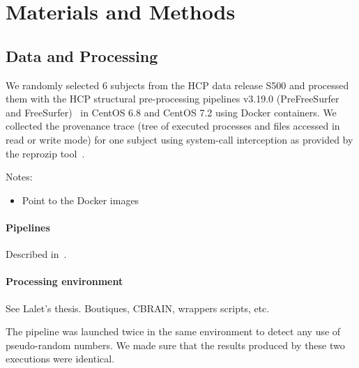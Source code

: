 \documentclass{article}
\begin{document}
\section{Materials and Methods}

\subsection{Data and Processing}

We randomly selected 6 subjects from the HCP data release S500 and
processed them with the HCP structural pre-processing pipelines
v3.19.0 (PreFreeSurfer and FreeSurfer)~\cite{Glasser2013} in CentOS
6.8 and CentOS 7.2 using Docker containers. We collected the
provenance trace (tree of executed processes and files accessed in
read or write mode) for one subject using system-call interception as
provided by the reprozip tool~\cite{5}.

Notes:
\begin{itemize}
\item Point to the Docker images
\end{itemize}

\paragraph{Pipelines}

Described in~\cite{glasser2013minimal}.

\paragraph{Processing environment}

See Lalet's thesis. Boutiques, CBRAIN, wrappers scripts, etc.

The pipeline was launched twice in the same
environment to detect any use of pseudo-random numbers. We
made sure that the results produced by these two executions were
identical.
\end{document}
